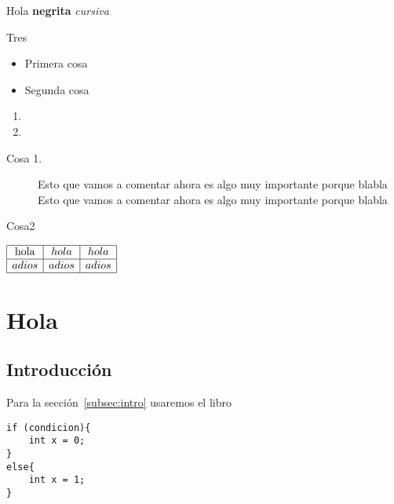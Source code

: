 
Hola \textbf{negrita} \emph{cursiva}


Tres

\begin{itemize}
\item
Primera cosa

\item
Segunda cosa
\end{itemize}

\begin{enumerate}
\item

\item
\end{enumerate}

\begin{description}
\item[Cosa 1.] Esto que vamos a comentar ahora es algo muy importante
porque blabla Esto que vamos a comentar ahora es algo muy importante
porque blabla

\item[Cosa2]
\end{description}

\begin{example}
\end{example}

$
\begin{array}{|c|c|c|}
\hline
\mathtt{\mathrm{hola}} & hola & hola\\
\hline
adios & adios & adios\\
\hline
\end{array}
$

\section{Hola}

\subsection{Introducción\label{subsec:intro}}

Para la sección~\ref{subsec:intro} usaremos el libro \cite{pimcdDuoCode14}

{\codesize
\lstset{language=Java}
\begin{lstlisting}[frame=single]
if (condicion){
	int x = 0;
}
else{
	int x = 1;
}
\end{lstlisting}
}